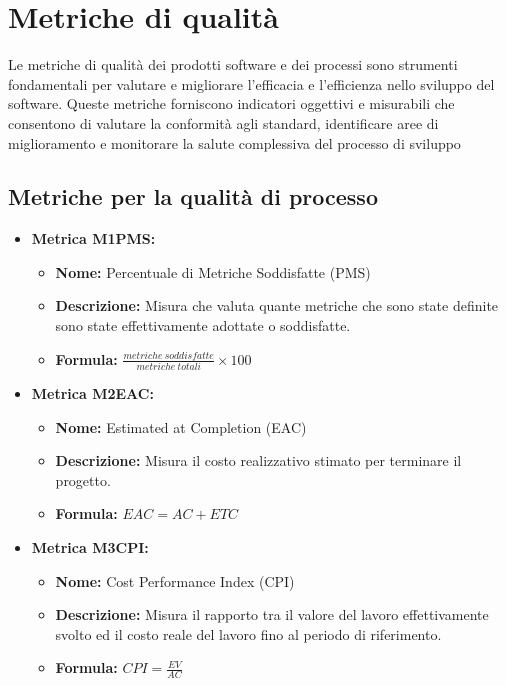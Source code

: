 \section{Metriche di qualità}
Le metriche di qualità dei prodotti software e dei processi sono strumenti fondamentali per valutare e migliorare l'efficacia e l'efficienza nello sviluppo del software. Queste metriche forniscono indicatori oggettivi e misurabili che consentono di valutare la conformità agli standard, identificare aree di miglioramento e monitorare la salute complessiva del processo di sviluppo

\subsection{Metriche per la qualità di processo}
\begin{itemize}
    \item \textbf{Metrica M1PMS:}
           \begin{itemize}
            \item \textbf{Nome:} Percentuale di Metriche Soddisfatte (PMS)
            \item \textbf{Descrizione:} Misura che valuta quante metriche che sono state definite sono state effettivamente adottate o soddisfatte.
            \item \textbf{Formula:} $\frac{metriche \ soddisfatte}{metriche \ totali}\times 100$
           \end{itemize}

    \item \textbf{Metrica M2EAC:}
          \begin{itemize}
              \item \textbf{Nome:} Estimated at Completion (EAC)
              \item \textbf{Descrizione:} Misura il costo realizzativo stimato per terminare il progetto.
              \item \textbf{Formula:} $EAC = AC + ETC$
          \end{itemize}

    \item \textbf{Metrica M3CPI:}
          \begin{itemize}
              \item \textbf{Nome:} Cost Performance Index (CPI)
              \item \textbf{Descrizione:} Misura il rapporto tra il valore del lavoro effettivamente svolto ed il costo reale del lavoro fino al periodo di riferimento.
              \item \textbf{Formula:} $CPI = \frac{EV}{AC}$
          \end{itemize}


\end{itemize}
